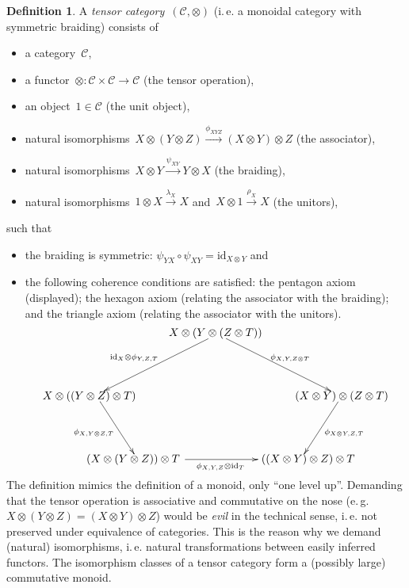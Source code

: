 \documentclass[a4paper,english,12pt]{scrartcl}
\theoremstyle{definition}
\newtheorem{defn}{Definition}[section]
\theoremstyle{plain}
\theoremstyle{remark}
\newcommand{\C}{\mathcal{C}}
\newcommand{\id}{\mathrm{id}}
\newcommand{\xra}[1]{\xrightarrow{#1}}
\renewcommand{\_}{\mathpunct{.}\,}
\newcommand{\?}{\,{:}\,}
\begin{document}
\begin{defn}A \emph{tensor category}~$(\C,\otimes)$ (i.\,e. a monoidal category with
symmetric braiding) consists of
\begin{itemize}
\item a category~$\C$,
\item a functor~${\otimes} : \C \times \C \to \C$ (the tensor operation),
\item an object~$1 \in \C$ (the unit object),
\item natural isomorphisms~$X \otimes (Y \otimes Z) \xra{\phi_{XYZ}} (X \otimes
Y) \otimes Z$ (the associator),
\item natural isomorphisms~$X \otimes Y \xra{\psi_{XY}} Y \otimes X$ (the
braiding),
\item natural isomorphisms~$1 \otimes X \xra{\lambda_X} X$ and~$X \otimes 1
\xra{\rho_X} X$ (the unitors),
\end{itemize}
such that
\begin{itemize}
\item the braiding is symmetric: $\psi_{YX} \circ \psi_{XY} = \id_{X \otimes
Y}$ and
\item the following coherence conditions are satisfied: the pentagon axiom
(displayed); the hexagon axiom (relating the associator with the braiding); and
the triangle axiom (relating the associator with the unitors).
\[ \xy
(0,20)*{X \otimes (Y \otimes (Z \otimes T))}="1"; 
(40,0)*{(X \otimes Y) \otimes (Z \otimes T)}="2"; 
(27,-20)*{\quad\ ((X \otimes Y) \otimes Z) \otimes T}="3"; 
(-27,-20)*{(X \otimes (Y \otimes Z)) \otimes T\!\!\!}="4"; 
(-40,0)*{X \otimes ((Y \otimes Z) \otimes T)}="5"; 
{\ar^{\phi_{X,Y,Z \otimes T}} "1";"2"} 
{\ar^{\phi_{X\otimes Y,Z,T}} "2";"3"} 
{\ar_{\id_X \otimes \phi_{Y,Z,T}\quad} "1";"5"} 
{\ar_{\phi_{X,Y\otimes Z,T}} "5";"4"} 
{\ar_{\!\!\!\!\!\!\!\!\phi_{X,Y,Z} \otimes \id_T} "4";"3"} 
\endxy \]
\end{itemize}
\end{defn}

The definition mimics the definition of a monoid, only ``one level up''.
Demanding that the tensor operation is associative and commutative on the nose
(e.\,g. $X \otimes (Y \otimes Z) = (X \otimes Y) \otimes Z$) would be
\emph{evil} in the technical sense, i.\,e. not preserved under equivalence of
categories. This is the reason why we demand (natural) isomorphisms, i.\,e.
natural transformations between easily inferred functors.
The isomorphism classes of a tensor category form a (possibly large) commutative monoid.
\end{document}
